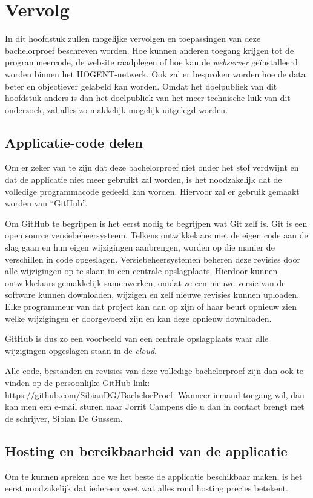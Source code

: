 \chapter{Vervolg}
\label{ch:vervolg}

In dit hoofdstuk zullen mogelijke vervolgen en toepassingen van deze bachelorproef beschreven worden. Hoe kunnen anderen toegang krijgen tot de programmeercode, de website raadplegen of hoe kan de \textit{webserver} geïnstalleerd worden binnen het HOGENT-netwerk. Ook zal er besproken worden hoe de data beter en objectiever gelabeld kan worden. Omdat het doelpubliek van dit hoofdstuk anders is dan het doelpubliek van het meer technische luik van dit onderzoek, zal alles zo makkelijk mogelijk uitgelegd worden.

\section{Applicatie-code delen}
Om er zeker van te zijn dat deze bachelorproef niet onder het stof verdwijnt en dat de applicatie niet meer gebruikt zal worden, is het noodzakelijk dat de volledige programmacode gedeeld kan worden. Hiervoor zal er gebruik gemaakt worden van ``GitHub''.

Om GitHub te begrijpen is het eerst nodig te begrijpen wat Git zelf is. Git is een open source versiebeheersysteem. Telkens ontwikkelaars met de eigen code aan de slag gaan en hun eigen wijzigingen aanbrengen, worden op die manier de verschillen in code opgeslagen. Versiebeheersystemen beheren deze revisies door alle wijzigingen op te slaan in een centrale opslagplaats. Hierdoor kunnen ontwikkelaars gemakkelijk samenwerken, omdat ze een nieuwe versie van de software kunnen downloaden, wijzigen en zelf nieuwe revisies kunnen uploaden. Elke programmeur van dat project kan dan op zijn of haar beurt opnieuw zien welke wijzigingen er doorgevoerd zijn en kan deze opnieuw downloaden.~\autocite{Brown2019}

GitHub is dus zo een voorbeeld van een centrale opslagplaats waar alle wijzigingen opgeslagen staan in de \textit{cloud}.

Alle code, bestanden en revisies van deze volledige bachelorproef zijn dan ook te vinden op de persoonlijke GitHub-link: \url{https://github.com/SibianDG/BachelorProef}. Wanneer iemand toegang wil, dan kan men een e-mail sturen naar Jorrit Campens die u dan in contact brengt met de schrijver, Sibian De Gussem.

\section{Hosting en bereikbaarheid van de applicatie}
Om te kunnen spreken hoe we het beste de applicatie beschikbaar maken, is het eerst noodzakelijk dat iedereen weet wat alles rond hosting precies betekent.


